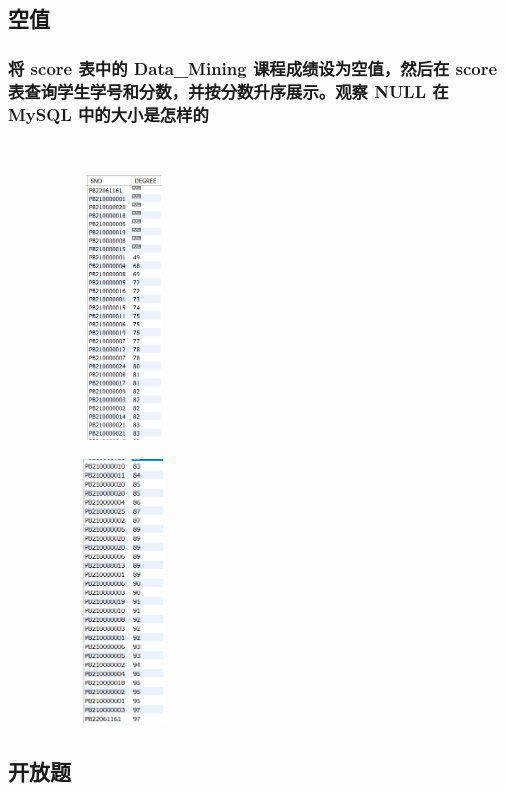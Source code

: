 \documentclass{ctexart}
\begin{document}
\subsection{空值}
\subsubsection{将 score 表中的 Data\_Mining 课程成绩设为空值，然后在 score 表查询学生学号和分数，并按分数升序展示。观察 NULL 在 MySQL 中的大小是怎样的}
\begin{lstlisting}[language=sql]
	
\end{lstlisting}
\begin{figure}[H]
	\centering 
	\includegraphics[height=7cm,width=4cm]{58.png}
	\end{figure}
	\begin{figure}[H]
		\centering 
		\includegraphics[height=7cm,width=4cm]{59.png}
		\end{figure}
\subsection{开放题}
\end{document}
